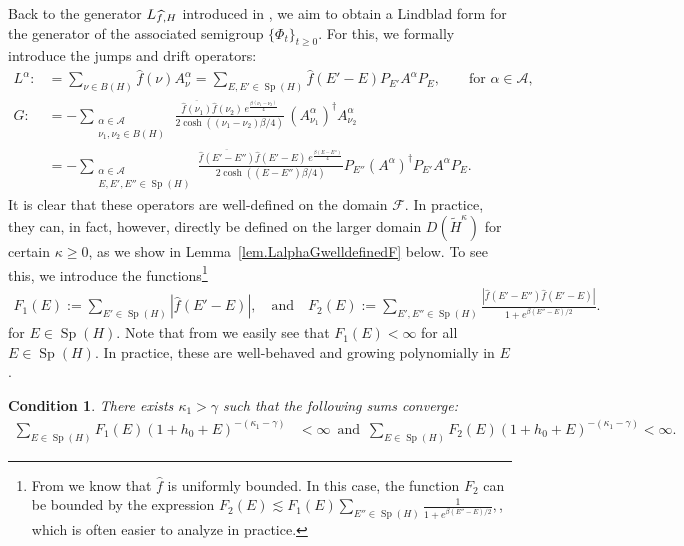 \documentclass[11pt]{amsart}
\newcommand{\nn}{\nonumber}
\newcommand{\1}{\mathbbm{1}}
\newtheorem{conditionB}{Condition}
\newcommand{\E}{\mathbb{E}}
\newcommand{\spec}{\operatorname{Sp}}
\theoremstyle{plain}
\theoremstyle{definition}
\theoremstyle{remark}
\numberwithin{equation}{section}
\begin{document}
 
 \smallskip
 
\noindent Back to the generator $L_{\smash{\widehat{f},H}}$ introduced in , we aim to obtain a Lindblad form for the generator of the associated semigroup $\{\Phi_t\}_{t\ge 0}$. For this, we formally introduce the jumps and drift operators:
\begin{align}
\label{eq:LalphainGenerationTheory}
L^\alpha:&=\sum_{\nu\in B(H)}\widehat{f}(\nu)A^\alpha_\nu=\sum_{E,E'\in\spec(H) }\widehat{f}(E'-E)P_{E'}A^\alpha P_{E},\qquad \text{for }\alpha\in\mathcal{A},\\
\nn G:&=-\sum_{\substack{\alpha\in\mathcal{A}\\\nu_1,\nu_2\in B(H)}}\, \frac{\overline{\widehat{f}(\nu_1)}\widehat{f}(\nu_2)\,e^{\frac{\beta(\nu_1-\nu_2)}{4}}}{2\cosh((\nu_1-\nu_2)\beta/4)}\,(A^\alpha_{\nu_1})^\dagger A^\alpha_{\nu_2} \\\label{eq:GinGenerationTheore}&=-\sum_{\substack{\alpha\in \mathcal{A}\\E,E',E''\in\spec(H)}}  \frac{\overline{\widehat{f}(E'-E'')}\widehat{f}(E'-E)\,e^{\frac{\beta(E-E'')}{4}}}{2\cosh((E-E'')\beta/4)}P_{E''}\left(A^\alpha\right)^\dagger P_{E'} A^\alpha P_E .
\end{align}
It is clear that these operators are well-defined on the domain $\mathcal{F}.$ In practice, they can, in fact, however, directly be defined on the larger domain $D(\widetilde H^\kappa)$ for certain $\kappa \ge 0$, as we show in Lemma~\ref{lem.LalphaGwelldefinedF} below.
To see this, we introduce the functions\footnote{From  we know that $\widehat f$ is uniformly bounded. In this case, the function $F_2$ can be bounded by the expression $F_2(E)\lesssim F_1(E)\sum_{E''\in\spec(H)}\frac{1}{1+e^{\beta(E''-E)/2}},$, which is often easier to analyze in practice.}
\begin{align}
\label{eq:defF_1F_2}
    F_1(E):= \sum_{E'\in\spec(H)} |\widehat f(E'-E)|,\quad\text{and}\quad F_2(E):=\sum_{E',E''\in\spec(H)}  \frac{|\widehat{f}(E'-E'')\widehat{f}(E'-E)|}{1+e^{\beta(E''-E)/2}}.
\end{align}
for $E\in\spec(H).$ Note that from  we easily see that $F_1(E)<\infty$ for all $E\in\spec(H).$ In practice, these are well-behaved and growing polynomially in $E$.
\begin{framed}
\begin{conditionB}\label{eq:F_1Kill}
There exists $\kappa_1>\gamma$ such that the following sums converge:
\begin{align}
\label{eq:kappa_1}
\sum_{E\in\spec(H)} F_1(E)(1+h_0+E)^{-(\kappa_1-\gamma)}&<\infty\, \text{ and }\,  \sum_{E\in\spec(H)} F_2(E) \left(1+h_0+E\right)^{-(\kappa_1-\gamma)}<\infty.
\end{align}
\end{conditionB}
\end{framed}
\end{document}
